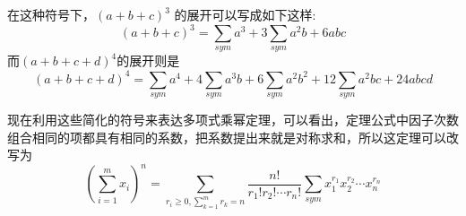 在这种符号下，$(a+b+c)^3$ 的展开可以写成如下这样:
\begin{equation*}
  (a+b+c)^3 = \sum_{sym}a^3+3\sum_{sym}a^2b+6abc
\end{equation*}
而$(a+b+c+d)^4$的展开则是
\begin{equation*}
  (a+b+c+d)^4 = \sum_{sym} a^4 + 4 \sum_{sym}a^3b + 6\sum_{sym}a^2b^2+12\sum_{sym}a^2bc+24abcd
\end{equation*}

现在利用这些简化的符号来表达多项式乘幂定理，可以看出，定理公式中因子次数组合相同的项都具有相同的系数，把系数提出来就是对称求和，所以这定理可以改写为
\begin{equation*}
  \left( \sum_{i=1}^m x_i \right)^n = \sum_{r_i \geqslant 0, \sum_{k=1}^m r_k=n} \frac{n!}{r_1!r_2!\cdots r_n!} \sum_{sym} x_1^{r_1}x_2^{r_2}\cdots x_n^{r_n}
\end{equation*}

